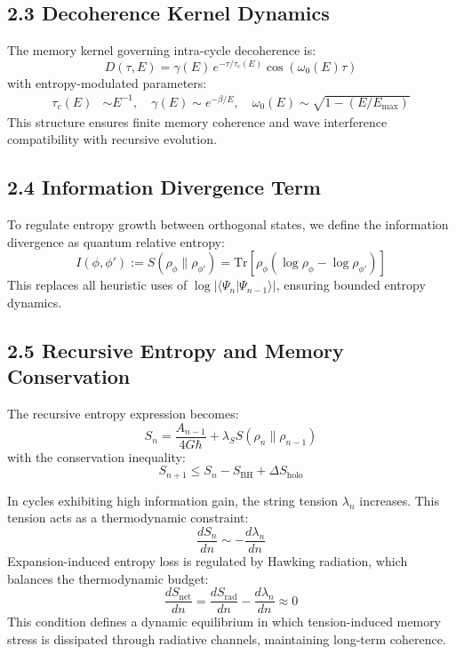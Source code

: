 \subsection{2.3 Decoherence Kernel Dynamics}

The memory kernel governing intra-cycle decoherence is:
\begin{equation}
D(\tau, E) = \gamma(E) \, e^{-\tau/\tau_c(E)} \cos(\omega_0(E) \tau)
\end{equation}
with entropy-modulated parameters:
\begin{align*}
\tau_c(E) &\sim E^{-1}, \quad \gamma(E) \sim e^{-\beta / E}, \quad \omega_0(E) \sim \sqrt{1 - \left(E / E_{\text{max}}\right)}
\end{align*}
This structure ensures finite memory coherence and wave interference compatibility with recursive evolution.

\subsection{2.4 Information Divergence Term}

To regulate entropy growth between orthogonal states, we define the information divergence as quantum relative entropy:
\begin{equation}
I(\phi, \phi') := S(\rho_\phi \| \rho_{\phi'}) = \mathrm{Tr}\left[ \rho_\phi \left( \log \rho_\phi - \log \rho_{\phi'} \right) \right]
\end{equation}
This replaces all heuristic uses of \( \log |\langle \Psi_n | \Psi_{n-1} \rangle| \), ensuring bounded entropy dynamics.

\subsection{2.5 Recursive Entropy and Memory Conservation}

The recursive entropy expression becomes:
\begin{equation}
S_n = \frac{A_{n-1}}{4G\hbar} + \lambda_S S(\rho_n \| \rho_{n-1})
\end{equation}
with the conservation inequality:
\begin{equation}
S_{n+1} \leq S_n - S_{\text{BH}} + \Delta S_{\text{holo}}
\end{equation}

In cycles exhibiting high information gain, the string tension \( \lambda_n \) increases. This tension acts as a thermodynamic constraint:
\begin{equation}
\frac{dS_n}{dn} \sim -\frac{d\lambda_n}{dn}
\end{equation}
Expansion-induced entropy loss is regulated by Hawking radiation, which balances the thermodynamic budget:
\begin{equation}
\frac{dS_{\text{net}}}{dn} = \frac{dS_{\text{rad}}}{dn} - \frac{d\lambda_n}{dn} \approx 0
\end{equation}
This condition defines a dynamic equilibrium in which tension-induced memory stress is dissipated through radiative channels, maintaining long-term coherence.

